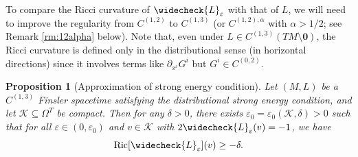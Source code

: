 \documentclass[a4paper,11pt]{article}
\numberwithin{equation}{section}
\theoremstyle{definition}
\theoremstyle{plain}
\newtheorem{Proposition}[Definition]{Proposition}
\newcommand{\eps}{\varepsilon}
\newcommand{\Ric}{\mathrm{Ric}}
\begin{document}
To compare the Ricci curvature of $\widecheck{L}_\eps$ with that of $L$, we will need to improve the regularity from $C^{(1,2)}$ to $C^{(1,3)}$ (or $C^{(1,2),\alpha}$ with $\alpha>1/2$; see Remark \ref{rm:12alpha} below).
Note that, even under $L \in C^{(1,3)}(TM \setminus \mathbf{0})$, the Ricci curvature is defined only in the distributional sense (in horizontal directions) since it involves terms like $\partial_{x^i} G^i$ but $G^i \in C^{(0,2)}$.

\begin{Proposition}[Approximation of strong energy condition]
\label{Prop: ApproxtimelikeRiccibound}
    Let $(M,L)$ be a $C^{(1,3)}$ Finsler spacetime satisfying the distributional strong energy condition, and let $\mathcal{K} \subseteq \Omega^T$ be compact.
    Then for any $\delta >0$, there exists $\eps_0 =\eps_0(\mathcal{K},\delta) >0$ such that for all $\eps \in (0,\eps_0)$ and $v \in \mathcal{K}$ with $2 \widecheck{L}_\eps(v)=-1$, we have
    \begin{equation*}
        \Ric[\widecheck{L}_\eps](v) \ge - \delta.
    \end{equation*}
\end{Proposition}
\end{document}
